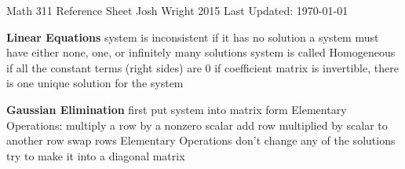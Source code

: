 \documentclass[12pt]{article}
\begin{document}
\begin{center}
Math 311 Reference Sheet
\hfill \textcopyright Josh Wright 2015 \hfill
Last Updated: \today
\end{center}

\begin{multicols*}{2}
\begin{flushleft}
\begin{outline}[longenum]

\newlength{\upspacelength}
\setlength{\upspacelength}{0px}
\newcommand{\upspace}{\vspace{\upspacelength}}
\newcommand{\zzz}[1]{\upspace \0 \textbf{#1} }
\let\oldOne\1\let\oldTwo\2\let\oldThree\3\let\oldFour\4
\renewcommand{\1}{\upspace \oldOne  }
\renewcommand{\2}{\upspace \oldTwo  }
\renewcommand{\3}{\upspace \oldThree}
\renewcommand{\4}{\upspace \oldFour }

\zzz{Linear Equations}
  \1 system is inconsistent if it has no solution
  \1 a system must have either none, one, or infinitely many solutions
  \1 system is called Homogeneous if all the constant terms (right sides) are 0
  \1 if coefficient matrix is invertible, there is one unique solution for the system

\zzz{Gaussian Elimination}
  \1 first put system into matrix form
  \1 Elementary Operations:
    \2 multiply a row by a nonzero scalar
    \2 add row multiplied by scalar to another row
    \2 swap rows
  \1 Elementary Operations don't change any of the solutions
  \1 try to make it into a diagonal matrix


\end{outline}
\end{flushleft}
\end{multicols*}
\end{document}
